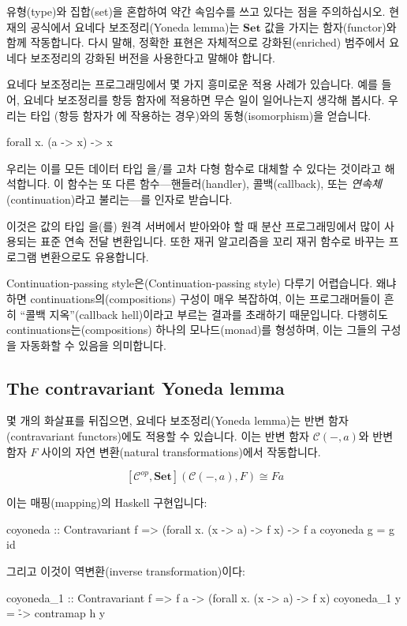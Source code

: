 \documentclass[DaoFP]{subfiles}
\begin{document}
유형(type)와 집합(set)을 혼합하여 약간 속임수를 쓰고 있다는 점을 주의하십시오. 현재의 공식에서 요네다 보조정리(Yoneda lemma)는 $\mathbf{Set}$ 값을 가지는 함자(functor)와 함께 작동합니다. 다시 말해, 정확한 표현은 자체적으로 강화된(enriched) 범주에서 요네다 보조정리의 강화된 버전을 사용한다고 말해야 합니다.

요네다 보조정리는 프로그래밍에서 몇 가지 흥미로운 적용 사례가 있습니다. 예를 들어, 요네다 보조정리를 항등 함자에 적용하면 무슨 일이 일어나는지 생각해 봅시다. 우리는 타입  (항등 함자가 에 작용하는 경우)와의 동형(isomorphism)을 얻습니다.
\begin{haskell}
forall x. (a -> x) -> x
\end{haskell}
우리는 이를 모든 데이터 타입 을/를 고차 다형 함수로 대체할 수 있다는 것이라고 해석합니다. 이 함수는 또 다른 함수---핸들러(handler), 콜백(callback), 또는 \emph{연속체}(continuation)라고 불리는---를 인자로 받습니다.

이것은 값의 타입 을(를) 원격 서버에서 받아와야 할 때 분산 프로그래밍에서 많이 사용되는 표준 연속 전달 변환입니다. 또한 재귀 알고리즘을 꼬리 재귀 함수로 바꾸는 프로그램 변환으로도 유용합니다.

Continuation-passing style은(Continuation-passing style) 다루기 어렵습니다. 왜냐하면 continuations의(compositions) 구성이 매우 복잡하여, 이는 프로그래머들이 흔히 ``콜백 지옥''(callback hell)이라고 부르는 결과를 초래하기 때문입니다. 다행히도 continuations는(compositions) 하나의 모나드(monad)를 형성하며, 이는 그들의 구성을 자동화할 수 있음을 의미합니다.

\subsection{The contravariant Yoneda lemma}

몇 개의 화살표를 뒤집으면, 요네다 보조정리(Yoneda lemma)는 반변 함자(contravariant functors)에도 적용할 수 있습니다. 이는 반변 함자 $\mathcal{C}(-, a)$와 반변 함자 $F$ 사이의 자연 변환(natural transformations)에서 작동합니다.

\[ [\mathcal{C}^{op}, \mathbf{Set}]( \mathcal{C}(-, a), F) \cong F a \]

이는 매핑(mapping)의 Haskell 구현입니다:
\begin{haskell}
coyoneda :: Contravariant f => (forall x. (x -> a) -> f x) -> f a
coyoneda g = g id
\end{haskell}
그리고 이것이 역변환(inverse transformation)이다:
\begin{haskell}
coyoneda_1 :: Contravariant f => f a -> (forall x. (x -> a) -> f x)
coyoneda_1 y = \h -> contramap h y
\end{haskell}
\end{document}
